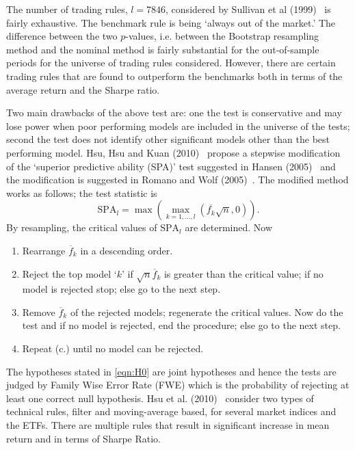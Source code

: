 The number of trading rules, $l=7846$, considered by Sullivan et al (1999)~\cite{sullivan1999data} is fairly exhaustive. The benchmark rule is being `always out of the market.' The difference between the two $p$-values, i.e. between the Bootstrap resampling method and the nominal method is fairly substantial for the out-of-sample periods for the universe of trading rules considered. However, there are certain trading rules that are found to outperform the benchmarks both in terms of the average return and the Sharpe ratio.


Two main drawbacks of the above test are: one the test is conservative and may lose power when poor performing models are included in the universe of the tests; second the test does not identify other significant models other than the best performing model. Hsu, Hsu and Kuan (2010)~\cite{hsukuan2010} propose a stepwise modification of the `superior predictive ability (SPA)' test suggested in Hansen (2005)~\cite{hansen2005} and the modification is suggested in Romano and Wolf (2005)~\cite{romano2005}. The modified method works as follows; the test statistic is
	\begin{equation} \label{eqn:SPA}
	\text{SPA}_l = \max\left(\max_{k=1,\ldots,l} ( \overline{f_k} \sqrt{n}, 0 ) \right).
	\end{equation}
By resampling, the critical values of $\text{SPA}_l$ are determined. Now


\begin{enumerate}[(a.)]
\item Rearrange $\overline{f}_k$ in a descending order.
\item Reject the top model `$k$' if $\sqrt{n}\overline{f}_k$ is greater than the critical value; if no model is rejected stop; else go to the next step.
\item Remove $\overline{f}_k$ of the rejected models; regenerate the critical values. Now do the test and if no model is rejected, end the procedure; else go to the next step.
\item Repeat (c.) until no model can be rejected.
\end{enumerate}


The hypotheses stated in \eqref{eqn:H0} are joint hypotheses and hence the tests are judged by Family Wise Error Rate (FWE) which is the probability of rejecting at least one correct null hypothesis. Hsu et al. (2010)~\cite{hsukuan2010} consider two types of technical rules, filter and moving-average based, for several market indices and the ETFs. There are multiple rules that result in significant increase in mean return and in terms of Sharpe Ratio.


